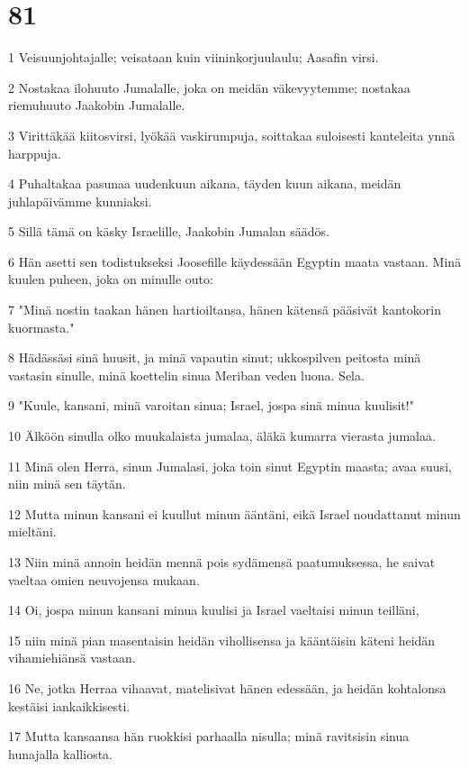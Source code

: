 \chapter{81}

\par 1 Veisuunjohtajalle; veisataan kuin viininkorjuulaulu; Aasafin virsi.
\par 2 Nostakaa ilohuuto Jumalalle, joka on meidän väkevyytemme; nostakaa riemuhuuto Jaakobin Jumalalle.
\par 3 Virittäkää kiitosvirsi, lyökää vaskirumpuja, soittakaa suloisesti kanteleita ynnä harppuja.
\par 4 Puhaltakaa pasunaa uudenkuun aikana, täyden kuun aikana, meidän juhlapäivämme kunniaksi.
\par 5 Sillä tämä on käsky Israelille, Jaakobin Jumalan säädös.
\par 6 Hän asetti sen todistukseksi Joosefille käydessään Egyptin maata vastaan. Minä kuulen puheen, joka on minulle outo:
\par 7 "Minä nostin taakan hänen hartioiltansa, hänen kätensä pääsivät kantokorin kuormasta."
\par 8 Hädässäsi sinä huusit, ja minä vapautin sinut; ukkospilven peitosta minä vastasin sinulle, minä koettelin sinua Meriban veden luona. Sela.
\par 9 "Kuule, kansani, minä varoitan sinua; Israel, jospa sinä minua kuulisit!"
\par 10 Älköön sinulla olko muukalaista jumalaa, äläkä kumarra vierasta jumalaa.
\par 11 Minä olen Herra, sinun Jumalasi, joka toin sinut Egyptin maasta; avaa suusi, niin minä sen täytän.
\par 12 Mutta minun kansani ei kuullut minun ääntäni, eikä Israel noudattanut minun mieltäni.
\par 13 Niin minä annoin heidän mennä pois sydämensä paatumuksessa, he saivat vaeltaa omien neuvojensa mukaan.
\par 14 Oi, jospa minun kansani minua kuulisi ja Israel vaeltaisi minun teilläni,
\par 15 niin minä pian masentaisin heidän vihollisensa ja kääntäisin käteni heidän vihamiehiänsä vastaan.
\par 16 Ne, jotka Herraa vihaavat, matelisivat hänen edessään, ja heidän kohtalonsa kestäisi iankaikkisesti.
\par 17 Mutta kansaansa hän ruokkisi parhaalla nisulla; minä ravitsisin sinua hunajalla kalliosta.

